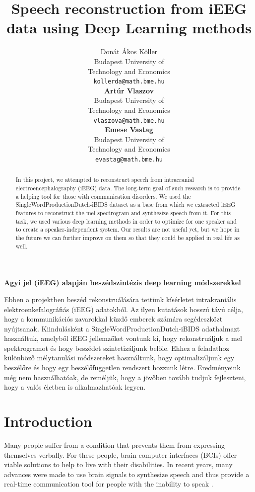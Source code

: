 \documentclass{article}
\title{Speech reconstruction from iEEG data using Deep Learning methods}
\author{
  Donát Ákos Köller \\
  Budapest University of \\ Technology and Economics\\
  \texttt{kollerda@math.bme.hu} \\
  \And
  \textbf{Artúr Vlaszov} \\
  Budapest University of \\ Technology and Economics \\
  \texttt{vlaszova@math.bme.hu} \\
  \And
  \textbf{Emese Vastag} \\
  Budapest University of \\ Technology and Economics \\
  \texttt{evastag@math.bme.hu} \\
}
\begin{document}
\maketitle

\begin{abstract}
  In this project, we attempted to reconstruct speech from intracranial electroencephalography (iEEG) data. The long-term goal of such research is to provide a helping tool for those with communication disorders. We used the SingleWordProductionDutch-iBIDS dataset as a base from which we extracted iEEG features to reconstruct the mel spectrogram and synthesize speech from it. For this task, we used various deep learning methods in order to optimize for one speaker and to create a speaker-independent system. Our results are not useful yet, but we hope in the future we can further improve on them so that they could be applied in real life as well.
\end{abstract}

\begin{center}
{\bfseries\LARGE Agyi jel (iEEG) alapján beszédszintézis deep learning módszerekkel \par}
\end{center}

\begin{kivonat}
  Ebben a projektben beszéd rekonstruálására tettünk kísérletet intrakraniális elektroenkefalográfiás (iEEG) adatokból. Az ilyen kutatások hosszú távú célja, hogy a kommunikációs zavarokkal küzdő emberek számára segédeszközt nyújtsanak. Kiindulásként a SingleWordProductionDutch-iBIDS adathalmazt használtuk, amelyből iEEG jellemzőket vontunk ki, hogy rekonstruáljuk a mel spektrogramot és hogy beszédet szintetizáljunk belőle. Ehhez a feladathoz különböző mélytanulási módszereket használtunk, hogy optimalizáljunk egy beszélőre és hogy egy beszélőfüggetlen rendszert hozzunk létre. Eredményeink még nem használhatóak, de reméljük, hogy a jövőben tovább tudjuk fejleszteni, hogy a valós életben is alkalmazhatóak legyen.
\end{kivonat}

\section{Introduction}

Many people suffer from a condition that prevents them from expressing themselves verbally. For these people, brain-computer interfaces (BCIs) offer viable solutions to help to live with their disabilities. In recent years, many advances were made to use brain signals to synthesize speech and thus provide a real-time communication tool for people with the inability to speak \cite{review1}.
\end{document}
